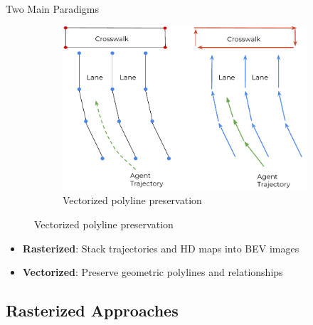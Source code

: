\documentclass[10pt,aspectratio=169]{beamer}
\begin{document}
\begin{frame}{Two Main Paradigms}
\begin{figure}[H]
\begin{subfigure}[t]{0.37\textwidth}
    \includegraphics[width=\textwidth]{docs/latex/figures/vectornet-2020-vector-repr.pdf}
    \caption{Vectorized polyline preservation}
    \label{fig:vectorized}
\end{subfigure}
\end{figure}

\begin{itemize}
    \item \textbf{Rasterized}: Stack trajectories and HD maps into BEV images
    \item \textbf{Vectorized}: Preserve geometric polylines and relationships
\end{itemize}
\end{frame}

\subsection{Rasterized Approaches}
\end{document}
